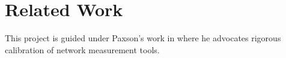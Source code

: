 \section{Related Work}
\label{sec:related-work}


This project is guided under Paxson's work in \cite{paxson2004strategies} where he advocates rigorous calibration of network measurement tools.


